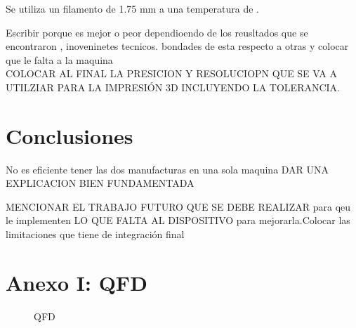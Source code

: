 Se utiliza un filamento de 1.75 mm a una temperatura de .  


Escribir porque es mejor o peor dependioendo de los reusltados que se encontraron , inoveninetes tecnicos. bondades de esta respecto a otras y colocar que le falta a la maquina\\

COLOCAR AL FINAL LA PRESICION Y RESOLUCIOPN QUE SE VA A UTILZIAR PARA LA IMPRESIÓN 3D INCLUYENDO LA TOLERANCIA.\\

\clearpage 
\chapter*{Conclusiones}

No es eficiente tener las dos manufacturas en una sola maquina DAR UNA EXPLICACION BIEN FUNDAMENTADA


MENCIONAR EL TRABAJO FUTURO QUE SE DEBE REALIZAR  para qeu le implementen LO QUE FALTA AL DISPOSITIVO para mejorarla.Colocar las limitaciones que tiene de integración final



\appendix

\chapter{Anexo I: QFD}
 \begin{figure}[H]
    \centering
    \caption{QFD}
    \label{fig:QFD}
\end{figure}

